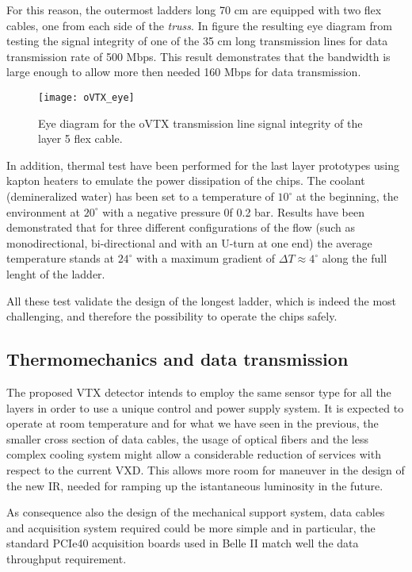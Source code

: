 For this reason, the outermost ladders long 70 cm are equipped with two flex cables, one from each side of the \textit{truss}. In figure  the resulting eye diagram from testing the signal integrity of one of the 35 cm long transmission lines for data transmission rate of 500 Mbps. This result demonstrates that the bandwidth is large enough to allow more then needed 160 Mbps for data transmission.


\begin{figure}[h!]
\centering
\texttt{[image: oVTX\_eye]}
\caption{Eye diagram for the oVTX transmission line signal integrity of the layer 5 flex cable.}
\label{fig:oVTX_eye}
\end{figure}


In addition, thermal test have been performed for the last layer prototypes using kapton heaters to emulate the power dissipation of the chips. The coolant (demineralized water) has been set to a temperature of $10^{\circ}$ at the beginning, the environment at $20^{\circ}$ with a negative pressure 0f 0.2 bar. Results have been demonstrated that for three different configurations of the flow (such as monodirectional, bi-directional and with an U-turn at one end) the average temperature stands at $24^{\circ}$ with a maximum gradient of $\Delta T \approx 4^{\circ}$ along the full lenght of the ladder. 

All these test validate the design of the longest ladder, which is indeed the most challenging, and therefore the possibility to operate the chips safely.


\subsection{Thermomechanics and data transmission}

The proposed VTX detector intends to employ the same sensor type for all the layers in order to use a unique control and power supply system. It is expected to operate at room temperature and for what we have seen in the previous, the smaller cross section of data cables, the usage of optical fibers and the less complex cooling system might allow a considerable reduction of services with respect to the current VXD. This allows more room for maneuver in the design of the new IR, needed for ramping up the istantaneous luminosity in the future.

As consequence also the design of the mechanical support system, data cables and acquisition system required could be more simple and in particular, the standard PCIe40 acquisition boards used in Belle II match well the data throughput requirement.

